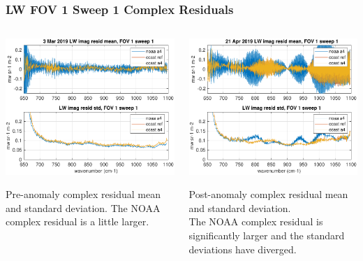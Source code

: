 \documentclass[10pt]{beamer}
\begin{document}
\begin{frame}
\frametitle{LW FOV 1 Sweep 1 Complex Residuals}
\begin{columns}[t]
\begin{column}{0.5\textwidth}
  \begin{centering}
  \includegraphics[width=\textwidth]{figures/LW_MW_good_imag_fov1_sd1.pdf}
  \end{centering}\vspace{3mm}
  Pre-anomaly complex residual mean and standard deviation.  The NOAA complex
  residual is a little larger.

\end{column}
\begin{column}{0.5\textwidth}  
  \begin{centering}
  \includegraphics[width=\textwidth]{figures/LW_MW_fail_imag_fov1_sd1.pdf}
  \end{centering}\vspace{3mm}
  Post-anomaly complex residual mean and standard deviation.  \\ The
  NOAA complex residual is significantly larger and the standard
  deviations have diverged.

\end{column}
\end{columns}
\end{frame}
\end{document}
